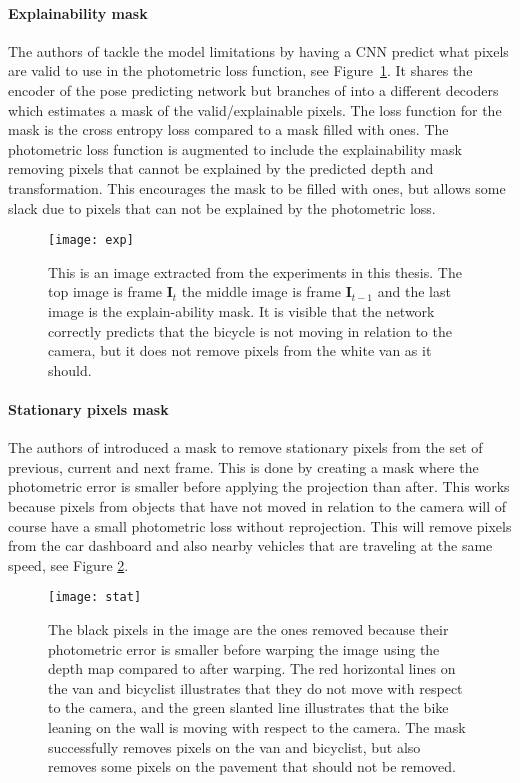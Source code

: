 \paragraph{Explainability mask} The authors of \cite{sfmlearner} tackle the model limitations by having a CNN predict what pixels are valid to use in the photometric loss function, see Figure~\ref{fig:exp}. It shares the encoder of the pose predicting network but branches of into a different decoders which estimates a mask of the valid/explainable pixels. The loss function for the mask is the cross entropy loss compared to a mask filled with ones. The photometric loss function is augmented to include the explainability mask removing pixels that cannot be explained by the predicted depth and transformation. This encourages the mask to be filled with ones, but allows some slack due to pixels that can not be explained by the photometric loss.

\begin{figure}[H]
	\centering
	\texttt{[image: exp]}
	\caption{This is an image extracted from the experiments in this thesis. The top image is frame $\textbf{I}_t$ the middle image is frame $\textbf{I}_{t-1}$ and the last image is the explain-ability mask. It is visible that the network correctly predicts that the bicycle is not moving in relation to the camera, but it does not remove pixels from the white van as it should.}
	\label{fig:exp}
\end{figure}

\paragraph{Stationary pixels mask} The authors of \cite{monodepth2} introduced a mask to remove stationary pixels from the set of previous, current and next frame. This is done by creating a mask where the photometric error is smaller before applying the projection than after. This works because pixels from objects that have not moved in relation to the camera will of course have a small photometric loss without reprojection. This will remove pixels from the car dashboard and also nearby vehicles that are traveling at the same speed, see Figure \ref{fig:stat}.

\begin{figure}[H]
	\centering
	\texttt{[image: stat]}
	\caption{The black pixels in the image are the ones removed because their photometric error is smaller before warping the image using the depth map compared to after warping. The red horizontal lines on the van and bicyclist illustrates that they do not move with respect to the camera, and the green slanted line illustrates that the bike leaning on the wall is moving with respect to the camera. The mask successfully removes pixels on the van and bicyclist, but also removes some pixels on the pavement that should not be removed.}
	\label{fig:stat}
\end{figure}
